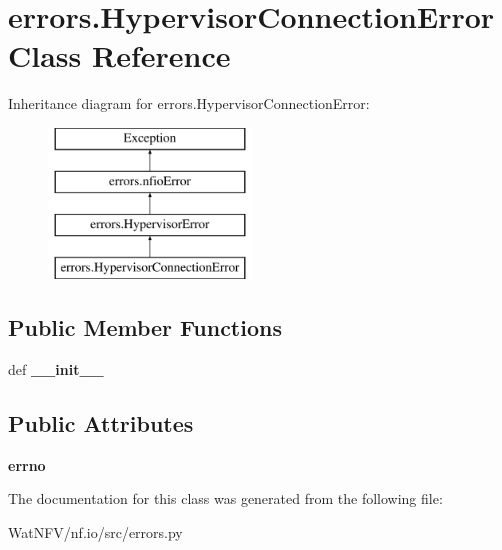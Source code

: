 \hypertarget{classerrors_1_1HypervisorConnectionError}{\section{errors.\-Hypervisor\-Connection\-Error Class Reference}
\label{classerrors_1_1HypervisorConnectionError}
}
Inheritance diagram for errors.\-Hypervisor\-Connection\-Error\-:\begin{figure}[H]
\begin{center}
\leavevmode
\includegraphics[height=4.000000cm]{classerrors_1_1HypervisorConnectionError}
\end{center}
\end{figure}
\subsection*{Public Member Functions}
\begin{DoxyCompactItemize}
\item 
\hypertarget{classerrors_1_1HypervisorConnectionError_a8ac18f912e2fa2866649688a43acc42c}{def {\bfseries \-\_\-\-\_\-init\-\_\-\-\_\-}}\label{classerrors_1_1HypervisorConnectionError_a8ac18f912e2fa2866649688a43acc42c}

\end{DoxyCompactItemize}
\subsection*{Public Attributes}
\begin{DoxyCompactItemize}
\item 
\hypertarget{classerrors_1_1HypervisorConnectionError_a4f3ea14dba51da58bf328573f69eabb4}{{\bfseries errno}}\label{classerrors_1_1HypervisorConnectionError_a4f3ea14dba51da58bf328573f69eabb4}

\end{DoxyCompactItemize}


The documentation for this class was generated from the following file\-:\begin{DoxyCompactItemize}
\item 
Wat\-N\-F\-V/nf.\-io/src/errors.\-py\end{DoxyCompactItemize}
